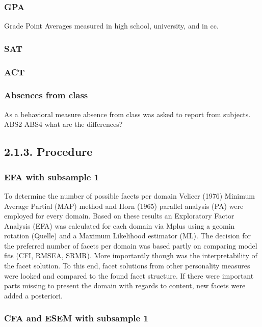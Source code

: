 \documentclass[,man,floatsintext]{apa6}
\begin{document}
\subsubsection{GPA}\label{gpa}

Grade Point Averages measured in high school, university, and in cc.

\subsubsection{SAT}\label{sat}

\subsubsection{ACT}\label{act}

\subsubsection{Absences from class}\label{absences-from-class}

As a behavioral measure absence from class was asked to report from
subjects. ABS2 ABS4 what are the differences?

\subsection{2.1.3. Procedure}\label{procedure}

\subsubsection{EFA with subsample 1}\label{efa-with-subsample-1}

To determine the number of possible facets per domain Velicer (1976)
Minimum Average Partial (MAP) method and Horn (1965) parallel analysis
(PA) were employed for every domain. Based on these results an
Exploratory Factor Analysis (EFA) was calculated for each domain via
Mplus using a geomin rotation (Quelle) and a Maximum Likelihood
estimator (ML). The decision for the preferred number of facets per
domain was based partly on comparing model fits (CFI, RMSEA, SRMR). More
importantly though was the interpretability of the facet solution. To
this end, facet solutions from other personality measures were looked
and compared to the found facet structure. If there were important parts
missing to present the domain with regards to content, new facets were
added a posteriori.

\subsubsection{CFA and ESEM with subsample
1}\label{cfa-and-esem-with-subsample-1}
\end{document}
